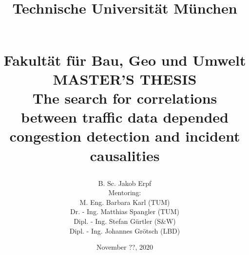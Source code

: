 \documentclass[a4paper,headsepline,footsepline,fontsize=11pt,BCOR=12mm,DIV=12]{report}
\begin{document}
\showthe\textwidth

\title{
\parbox{3cm}{}
Technische Universität München
\parbox{3cm}{}
\\
[0.3cm]
\smaller Fakultät für Bau, Geo und Umwelt\\
[2cm]
MASTER'S THESIS\\
[1cm]
\smaller The search for correlations between traffic data depended congestion detection and incident causalities}
\author{
B. Sc. Jakob Erpf\\ 
[1cm]
\small Mentoring:\\ 
\small M. Eng. Barbara Karl (TUM)\\ 
\small Dr. - Ing. Matthias Spangler (TUM)\\ 
\small Dipl. - Ing. Stefan Gürtler (S\&W)\\
\small Dipl. - Ing. Johannes Grötsch (LBD)
}
\date{November ??, 2020}
\maketitle
\end{document}
